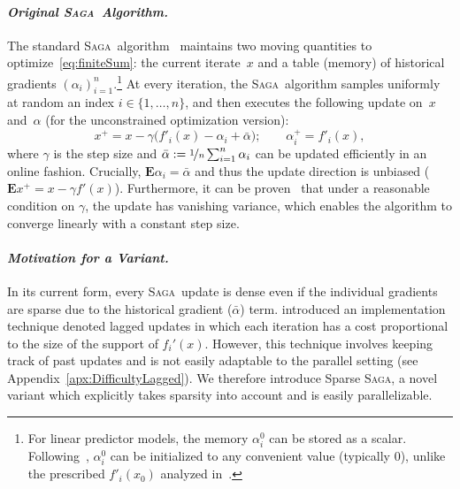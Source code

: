 \documentclass[twoside, 11pt]{article}
\newcommand{\stepsize}{\gamma}
\newcommand{\Econd}{\mathbf{E}}
\newcommand{\SAGA}{\textsc{Saga}}
\begin{document}
\paragraph{\textit{Original \SAGA\ Algorithm.}} The standard \SAGA\ algorithm~\citep{SAGA} maintains two moving quantities to optimize~\eqref{eq:finiteSum}: the current iterate~$x$ and a table (memory) of historical gradients $(\alpha_i)_{i=1}^n$.\footnote{For linear predictor models, the memory $\alpha_i^0$ can be stored as a scalar. Following~\cite{qsaga}, $\alpha_i^0$ can be initialized to any convenient value (typically $0$), unlike the prescribed $f'_i(x_0)$ analyzed in~\citep{SAGA}.}
At every iteration, the \SAGA\ algorithm samples uniformly at random an index $i \in \{1,\ldots, n\}$, and then executes the following update on~$x$ and~$\alpha$ (for the unconstrained optimization version):
\begin{equation}\label{eq:SAGAupdate}
x^{+} = x - \stepsize \big(f'_i(x) - \alpha_i + \bar \alpha\big); \qquad  \alpha_i^+ = f'_i(x),
\end{equation}
where $\stepsize$ is the step size and $\bar \alpha := \nicefrac{1}{n} \sum_{i=1}^n \alpha_i$ can be updated efficiently in an online fashion. Crucially, $\Econd \alpha_i = \bar \alpha$ and thus the update direction is unbiased ($\Econd x^{+} = x - \stepsize f'(x)$).
Furthermore, it can be proven~\citep[see][]{SAGA} that under a reasonable condition on $\stepsize$, the update has vanishing variance, which enables the algorithm to converge linearly with a constant step size.

\paragraph{\textit{Motivation for a Variant.}}
In its current form, every \SAGA\ update is dense even if the individual gradients are sparse due to the historical gradient ($\bar \alpha$) term.
\citet{laggedsaga} introduced an implementation technique denoted lagged updates in which each iteration has a cost proportional to the size of the support of $f_i'(x)$.
However, this technique involves keeping track of past updates and is not easily adaptable  to the parallel setting (see Appendix~\ref{apx:DifficultyLagged}).
We therefore introduce Sparse \SAGA, a novel variant which explicitly takes sparsity into account and is easily parallelizable.
\end{document}
